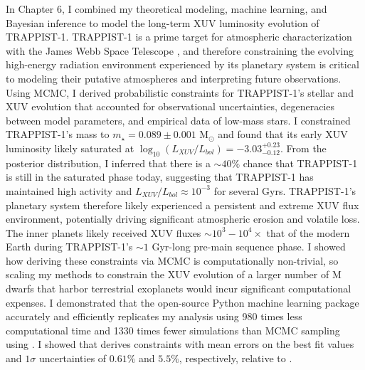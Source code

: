 In Chapter 6, I combined my theoretical modeling, machine learning, and Bayesian inference to model the long-term XUV luminosity evolution of TRAPPIST-1. TRAPPIST-1 is a prime target for atmospheric characterization with the James Webb Space Telescope \citep{Morley2017,Lustig2019}, and therefore constraining the evolving high-energy radiation environment experienced by its planetary system is critical to modeling their putative atmospheres and interpreting future observations. Using MCMC, I derived probabilistic constraints for TRAPPIST-1's stellar and XUV evolution that accounted for observational uncertainties, degeneracies between model parameters, and empirical data of low-mass stars. I constrained TRAPPIST-1's mass to $m_{\star} = 0.089 \pm{0.001}$ M$_{\odot}$ and found that its early XUV luminosity likely saturated at $\log_{10}(L_{XUV}/L_{bol}) = -3.03^{+0.23}_{-0.12}$. From the posterior distribution, I inferred that there is a ${\sim}40\%$ chance that TRAPPIST-1 is still in the saturated phase today, suggesting that TRAPPIST-1 has maintained high activity and $L_{XUV}/L_{bol} \approx 10^{-3}$ for several Gyrs. TRAPPIST-1's planetary system therefore likely experienced a persistent and extreme XUV flux environment, potentially driving significant atmospheric erosion and volatile loss. The inner planets likely received XUV fluxes ${\sim}10^3 - 10^4\times$ that of the modern Earth during TRAPPIST-1's ${\sim}1$ Gyr-long pre-main sequence phase. I showed how deriving these constraints via MCMC is computationally non-trivial, so scaling my methods to constrain the XUV evolution of a larger number of M dwarfs that harbor terrestrial exoplanets would incur significant computational expenses. I demonstrated that the open-source Python machine learning package \approxposterior accurately and efficiently replicates my analysis using 980 times less computational time and 1330 times fewer simulations than MCMC sampling using \emcee. I showed that \approxposterior derives constraints with mean errors on the best fit values and $1\sigma$ uncertainties of $0.61\%$ and $5.5\%$, respectively, relative to \emcee.

